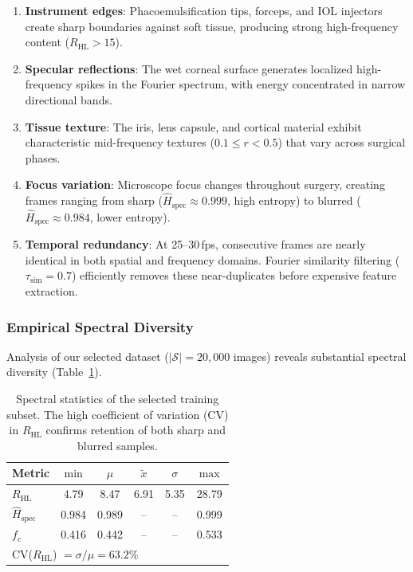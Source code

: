 \begin{enumerate}
    \item \textbf{Instrument edges}: Phacoemulsification tips, forceps, and
          IOL injectors create sharp boundaries against soft tissue,
          producing strong high-frequency content ($R_{\text{HL}} > 15$).

    \item \textbf{Specular reflections}: The wet corneal surface generates
          localized high-frequency spikes in the Fourier spectrum, with
          energy concentrated in narrow directional bands.

    \item \textbf{Tissue texture}: The iris, lens capsule, and cortical
          material exhibit characteristic mid-frequency textures
          ($0.1 \leq r < 0.5$) that vary across surgical phases.

    \item \textbf{Focus variation}: Microscope focus changes throughout
          surgery, creating frames ranging from sharp ($\hat{H}_{\text{spec}}
          \approx 0.999$, high entropy) to blurred ($\hat{H}_{\text{spec}}
          \approx 0.984$, lower entropy).

    \item \textbf{Temporal redundancy}: At 25--30\,fps, consecutive frames
          are nearly identical in both spatial and frequency domains.
          Fourier similarity filtering ($\tau_{\text{sim}} = 0.7$) efficiently
          removes these near-duplicates before expensive feature extraction.
\end{enumerate}

\subsubsection{Empirical Spectral Diversity}

Analysis of our selected dataset ($|\mathcal{S}| = 20{,}000$ images) reveals
substantial spectral diversity (Table~\ref{tab:spectral_stats}).

\begin{table}[h]
\centering
\caption{Spectral statistics of the selected training subset.
         The high coefficient of variation (CV) in $R_{\text{HL}}$ confirms
         retention of both sharp and blurred samples.}
\label{tab:spectral_stats}
\begin{tabular}{lccccc}
\toprule
\textbf{Metric} & $\min$ & $\mu$ & $\tilde{x}$ & $\sigma$ & $\max$ \\
\midrule
$R_{\text{HL}}$
    & 4.79 & 8.47 & 6.91 & 5.35 & 28.79 \\
$\hat{H}_{\text{spec}}$
    & 0.984 & 0.989 & -- & -- & 0.999 \\
$f_c$
    & 0.416 & 0.442 & -- & -- & 0.533 \\
\bottomrule
\multicolumn{6}{l}{\small CV($R_{\text{HL}}$) $= \sigma/\mu = 63.2\%$} \\
\end{tabular}
\end{table}


